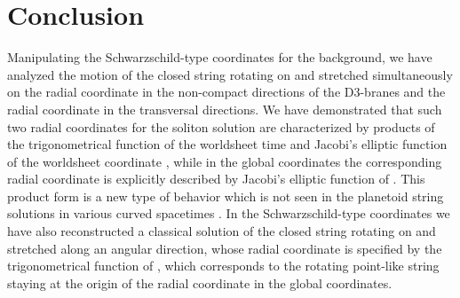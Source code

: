 \documentclass[12pt,a4paper]{article}
\begin{document}
\section{Conclusion}

Manipulating the Schwarzschild-type coordinates for the 
\coordHE{} background, we have analyzed the motion of 
the closed string rotating on \coordHE{} and stretched simultaneously
on the radial coordinate \coordHE{} in the non-compact directions of the 
D3-branes and the radial coordinate \coordHE{} in the transversal directions.
We have demonstrated that such two radial coordinates 
for the soliton solution are characterized by products of the
trigonometrical function of the worldsheet time \myHighlight{$\tau$}\coordHE{} and Jacobi's 
elliptic function of the worldsheet coordinate \myHighlight{$\sigma$}\coordHE{}, while
in the global coordinates the corresponding radial coordinate \myHighlight{$\rho$}\coordHE{}
is explicitly described by Jacobi's elliptic function of \myHighlight{$\sigma$}\coordHE{}.
This product form is a new type of behavior which is not seen
in the planetoid string solutions in various curved spacetimes 
\cite{VLS,VE,KM}.
In the Schwarzschild-type coordinates we have also reconstructed a 
classical solution of the closed string rotating on \coordHE{} and 
stretched along an angular direction, whose radial coordinate \coordHE{} is
specified by the trigonometrical function of \myHighlight{$\tau$}\coordHE{}, which corresponds
to the rotating point-like string staying at the origin of the
radial coordinate \myHighlight{$\rho$}\coordHE{} in the global coordinates.
\end{document}

